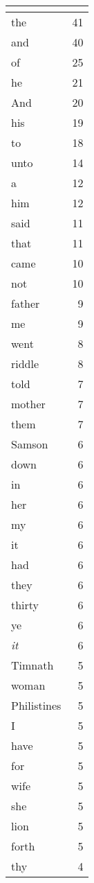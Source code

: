 \begin{center}
\begin{longtable}{l|r}
\hline \multicolumn{2}{c}{{ }} \\ \hline
\endfoot 
the & 41\\ \hline 
and & 40\\ \hline 
of & 25\\ \hline 
he & 21\\ \hline 
And & 20\\ \hline 
his & 19\\ \hline 
to & 18\\ \hline 
unto & 14\\ \hline 
a & 12\\ \hline 
him & 12\\ \hline 
said & 11\\ \hline 
that & 11\\ \hline 
came & 10\\ \hline 
not & 10\\ \hline 
father & 9\\ \hline 
me & 9\\ \hline 
went & 8\\ \hline 
riddle & 8\\ \hline 
told & 7\\ \hline 
mother & 7\\ \hline 
them & 7\\ \hline 
Samson & 6\\ \hline 
down & 6\\ \hline 
in & 6\\ \hline 
her & 6\\ \hline 
my & 6\\ \hline 
it & 6\\ \hline 
had & 6\\ \hline 
they & 6\\ \hline 
thirty & 6\\ \hline 
ye & 6\\ \hline 
\emph{it} & 6\\ \hline 
Timnath & 5\\ \hline 
woman & 5\\ \hline 
Philistines & 5\\ \hline 
I & 5\\ \hline 
have & 5\\ \hline 
for & 5\\ \hline 
wife & 5\\ \hline 
she & 5\\ \hline 
lion & 5\\ \hline 
forth & 5\\ \hline 
thy & 4\\ \hline 

\end{longtable}
\end{center}
